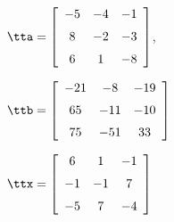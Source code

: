 {$\tta = \left[ \begin {array}{ccc} -5&-4&-1 \\ \noalign{\medskip} 8&-2&-3 \\ \noalign{\medskip} 6&1&-8\end {array} \right] $, 

$\ttb=\left[ \begin {array}{ccc} -21&-8&-19\\ \noalign{\medskip} 65&-11&-10 \\ \noalign{\medskip} 75 & -51&33  \end {array} \right] $}
{$\ttx=\left[ \begin {array}{ccc} 6&1&-1\\ \noalign{\medskip} -1&-1&7 \\ \noalign{\medskip} -5&7&-4  \end {array} \right] $}
